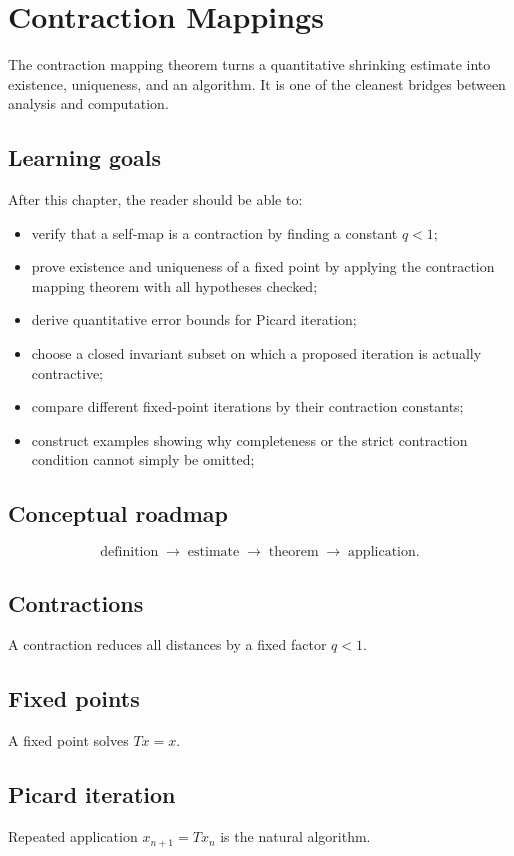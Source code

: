 \chapter{Contraction Mappings}
\label{ch:ii16}

The contraction mapping theorem turns a quantitative shrinking estimate into existence, uniqueness, and an algorithm. It is one of the cleanest bridges between analysis and computation.

\section*{Learning goals}
After this chapter, the reader should be able to:
\begin{itemize}
\item verify that a self-map is a contraction by finding a constant \(q<1\);
\item prove existence and uniqueness of a fixed point by applying the contraction mapping theorem with all hypotheses checked;
\item derive quantitative error bounds for Picard iteration;
\item choose a closed invariant subset on which a proposed iteration is actually contractive;
\item compare different fixed-point iterations by their contraction constants;
\item construct examples showing why completeness or the strict contraction condition cannot simply be omitted;
\end{itemize}
\section*{Conceptual roadmap}
\[
\boxed{\text{definition}\;\longrightarrow\;\text{estimate}\;\longrightarrow\;\text{theorem}\;\longrightarrow\;\text{application}.}
\]

\section{Contractions}
A contraction reduces all distances by a fixed factor $q<1$.

\section{Fixed points}
A fixed point solves $Tx=x$.

\section{Picard iteration}
Repeated application $x_{n+1}=Tx_n$ is the natural algorithm.


